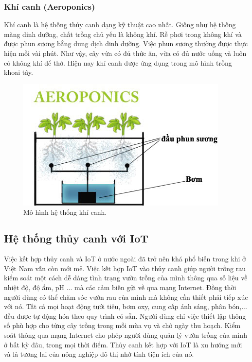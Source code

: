 \documentclass[a4paper,12pt,oneside]{article}
\begin{document}
\subsubsection{Khí canh (Aeroponics)}

\noindent Khí canh là hệ thống thủy canh dạng kỹ thuật cao nhất. Giống như hệ thống màng dinh dưỡng, chất trồng chủ yếu là không khí. Rễ phơi trong không khí và được phun sương bằng dung dịch dinh dưỡng. Việc phun sương thường được thực hiện mỗi vài phút. Như vậy, cây vừa có đủ thức ăn, vừa có đủ nước uống và luôn có không khí để thở. Hiện nay khí canh được ứng dụng trong mô hình trồng khoai tây.\\

\begin{center}
\begin{figure}[htp]
\begin{center}
\includegraphics[scale=.9]{hinh/aeroponics.jpg}
\end{center}
\caption{Mô hình hệ thống khí canh.}
\end{figure}
\end{center}
\subsection{Hệ thống thủy canh với IoT}
\noindent Việc kết hợp thủy canh và IoT ở nước ngoài đã trở nên khá phổ biến trong khi ở Việt Nam vẫn còn mới mẻ. Việc kết hợp IoT vào thủy canh giúp người trồng rau kiểm soát một cách dễ dàng tình trạng vườn trồng của mình thông qua số liệu về nhiệt độ, độ ẩm, pH ... mà các cảm biến gửi về qua mạng Internet. Đồng thời người dùng có thể chăm sóc vườn rau của mình mà không cần thiết phải tiếp xúc với nó. Tất cả mọi hoạt động tưới tiêu, bơm oxy, cung cấp ánh sáng, phân bón,... đều được tự động hóa theo quy trình có sẵn. Người dùng chỉ việc thiết lập thông số phù hợp cho từng cây trồng trong mỗi mùa vụ và chờ ngày thu hoạch. Kiểm soát thông qua mạng Internet cho phép người dùng quản lý vườn trồng của mình ở bất kỳ đâu, trong mọi thời điểm.  Thủy canh kết hợp với IoT là xu hướng mới và là tương lai của nông nghiệp đô thị nhờ tính tiện ích của nó.
\end{document}
